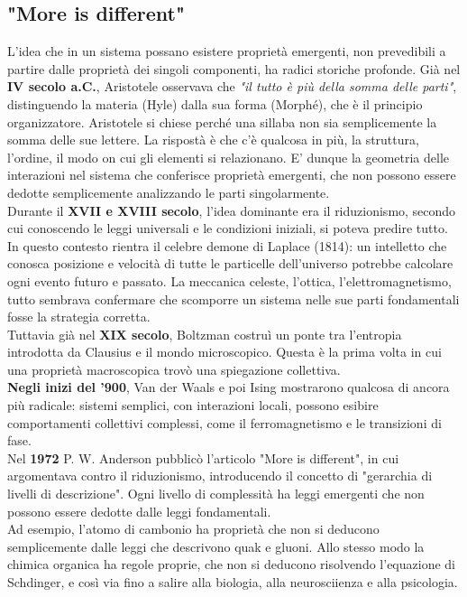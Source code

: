 \subsection{"More is different"}
L'idea che in un sistema possano esistere proprietà emergenti, non prevedibili a partire dalle proprietà dei singoli componenti, ha radici storiche profonde.
Già nel \textbf{IV secolo a.C.}, Aristotele osservava che \textit{"il tutto è più della somma delle parti"}, distinguendo la materia (Hyle) dalla sua forma (Morphé), che è il principio organizzatore. Aristotele si chiese perché una sillaba non sia semplicemente la somma delle sue lettere. La rispostà è che c'è qualcosa in più, la struttura, l'ordine, il modo on cui gli elementi si relazionano.
E' dunque la geometria delle interazioni nel sistema che conferisce proprietà emergenti, che non possono essere dedotte semplicemente analizzando le parti singolarmente. \\

Durante il \textbf{XVII e XVIII secolo}, l'idea dominante era il riduzionismo, secondo cui conoscendo le leggi universali e le condizioni iniziali, si poteva predire tutto. In questo contesto rientra il celebre demone di Laplace (1814): un intelletto che conosca posizione e velocità di tutte le particelle dell'universo potrebbe calcolare ogni evento futuro e passato.
La meccanica celeste, l'ottica, l'elettromagnetismo, tutto sembrava confermare che scomporre un sistema nelle sue parti fondamentali fosse la strategia corretta.\\

Tuttavia già nel \textbf{XIX secolo}, Boltzman costruì un ponte tra l'entropia introdotta da Clausius e il mondo microscopico. Questa è la prima volta in cui una proprietà macroscopica trovò una spiegazione collettiva.\\
\textbf{Negli inizi del '900}, Van der Waals e poi Ising mostrarono qualcosa di ancora più radicale: sistemi semplici, con interazioni locali, possono esibire comportamenti collettivi complessi, come il ferromagnetismo e le transizioni di fase.\\

Nel \textbf{1972} P. W. Anderson pubblicò l'articolo "More is different", in cui argomentava contro il riduzionismo, introducendo il concetto di "gerarchia di livelli di descrizione". Ogni livello di complessità ha leggi emergenti che non possono essere dedotte dalle leggi fondamentali.\\
Ad esempio, l'atomo di cambonio ha proprietà che non si deducono semplicemente dalle leggi che descrivono quak e gluoni. Allo stesso modo la chimica organica ha regole proprie, che non si deducono  risolvendo l'equazione di Schdinger, e così via fino a salire alla biologia, alla neurosciienza e alla psicologia.\\

